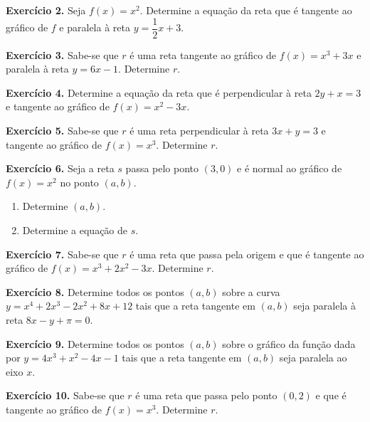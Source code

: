 \documentclass[12pt,a4paper]{article}
\begin{document}
\vspace{0.5cm}
\noindent\textbf{Exercício 2.}
Seja $f(x) = x^2$. Determine a equação da reta que é tangente ao gráfico de $f$ e paralela à reta $y = \dfrac{1}{2}x + 3$.

\vspace{0.5cm}
\noindent\textbf{Exercício 3.}
Sabe-se que $r$ é uma reta tangente ao gráfico de $f(x) = x^3 + 3x$ e paralela à reta $y = 6x - 1$. Determine $r$.

\vspace{0.5cm}
\noindent\textbf{Exercício 4.}
Determine a equação da reta que é perpendicular à reta $2y + x = 3$ e tangente ao gráfico de $f(x) = x^2 - 3x$.

\vspace{0.5cm}
\noindent\textbf{Exercício 5.}
Sabe-se que $r$ é uma reta perpendicular à reta $3x + y = 3$ e tangente ao gráfico de $f(x) = x^3$. Determine $r$.

\vspace{0.5cm}
\noindent\textbf{Exercício 6.} Seja a reta $s$ passa pelo ponto $(3, 0)$ e é normal ao gráfico de $f(x) = x^2$ no ponto $(a, b)$.
\begin{enumerate}
    \renewcommand{\theenumi}{\alph{enumi}}
    \renewcommand{\labelenumi}{\theenumi)}
    \item Determine $(a, b)$.
    \item Determine a equação de $s$.
\end{enumerate}

\vspace{0.5cm}
\noindent\textbf{Exercício 7.}
Sabe-se que $r$ é uma reta que passa pela origem e que é tangente ao gráfico de $f(x) = x^3 + 2x^2 - 3x$. Determine $r$.

\vspace{0.5cm}
\noindent\textbf{Exercício 8.}
Determine todos os pontos $(a, b)$ sobre a curva $y = x^4 + 2x^3 - 2x^2 + 8x + 12$ tais que a reta tangente em $(a, b)$ seja paralela à reta $8x - y + \pi = 0$.

\vspace{0.5cm}
\noindent\textbf{Exercício 9.}
Determine todos os pontos $(a, b)$ sobre o gráfico da função dada por $y = 4x^3 + x^2 - 4x - 1$ tais que a reta tangente em $(a, b)$ seja paralela ao eixo $x$.

\vspace{0.5cm}
\noindent\textbf{Exercício 10.}
Sabe-se que $r$ é uma reta que passa pelo ponto $(0, 2)$ e que é tangente ao gráfico de $f(x) = x^3$. Determine $r$.
\end{document}
